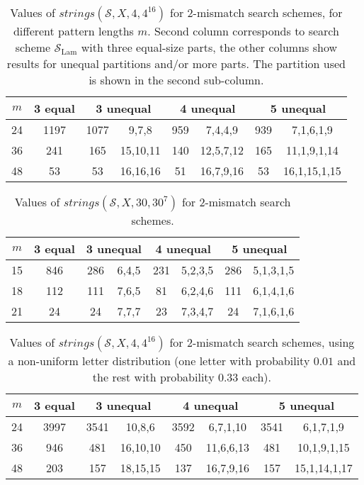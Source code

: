 \documentclass[12pt]{article}
\newcommand{\scheme}{\mathcal{S}}
\newcommand{\schemelam}{\mathcal{S}_{\text{Lam}}}
\newcommand{\partition}{X}
\newcommand{\numstrings}{\mathit{strings}}
\begin{document}
\begin{table}[!tb]
\caption{Values of $\numstrings(\scheme,\partition,4,4^{16})$ for $2$-mismatch
search schemes, for different pattern lengths $m$. 
Second column corresponds to 
search scheme $\schemelam$ with three equal-size parts, 
the other columns show results for unequal partitions and/or more
parts. The partition used is shown in the second sub-column. 
\label{tab:sigma4}}
\centering
\begin{tabular}{|c|c|c|c|c|c|c|c|}
\hline
$m$ & 3 equal & \multicolumn{2}{|c|}{3 unequal} &
\multicolumn{2}{|c|}{4 unequal} & \multicolumn{2}{|c|}{5 unequal} \\
\hline
24 & 1197 &  1077 & 9,7,8    &  959 & 7,4,4,9   &  939 & 7,1,6,1,9 \\
36 &  241 &   165 & 15,10,11 &  140 & 12,5,7,12 &  165 & 11,1,9,1,14 \\
48 &   53 &    53 & 16,16,16 &   51 & 16,7,9,16 &   53 & 16,1,15,1,15 \\
\hline
\end{tabular}
\end{table}
\begin{table}[!tb]
\caption{Values of $\numstrings(\scheme,\partition,30,30^{7})$ for $2$-mismatch
search schemes.\label{tab:sigma30}}
\centering
\begin{tabular}{|c|c|c|c|c|c|c|c|}
\hline
$m$ & 3 equal & \multicolumn{2}{|c|}{3 unequal} &
\multicolumn{2}{|c|}{4 unequal} & \multicolumn{2}{|c|}{5 unequal} \\
\hline
15 &  846 &  286 & 6,4,5 &  231 & 5,2,3,5 &  286 & 5,1,3,1,5 \\
18 &  112 &  111 & 7,6,5 &   81 & 6,2,4,6 &  111 & 6,1,4,1,6 \\
21 &   24 &   24 & 7,7,7 &   23 & 7,3,4,7 &   24 & 7,1,6,1,6 \\
\hline
\end{tabular}
\end{table}
\begin{table}[!tb]
\caption{Values of $\numstrings(\scheme,\partition,4,4^{16})$ for $2$-mismatch
search schemes, using a non-uniform letter distribution (one letter with
probability $0.01$ and the rest with probability $0.33$
each).\label{tab:nonuniform}}
\centering
\begin{tabular}{|c|c|c|c|c|c|c|c|}
\hline
$m$ & 3 equal & \multicolumn{2}{|c|}{3 unequal} &
\multicolumn{2}{|c|}{4 unequal} & \multicolumn{2}{|c|}{5 unequal} \\
\hline
24 & 3997 &  3541 & 10,8,6   & 3592 & 6,7,1,10  & 3541 & 6,1,7,1,9 \\
36 &  946 &   481 & 16,10,10 &  450 & 11,6,6,13 &  481 & 10,1,9,1,15 \\
48 &  203 &   157 & 18,15,15 &  137 & 16,7,9,16 &  157 & 15,1,14,1,17\\
\hline
\end{tabular}
\end{table}
\end{document}
